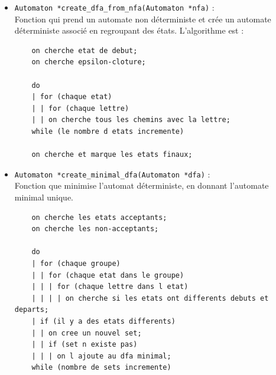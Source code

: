\documentclass[12pt]{article}
\begin{document}
\begin{itemize}
  \begin{lstlisting}
    entre : etat initial sous-automate
    entre : etat final sous-automate

    for (chaque feuille de l arbre)
    | if (feuille == ')')
    | | continue;
    | if (feuille == '.')
    | | on cree transition vide entre etat initial 2 et final 1;
    | | on ajoute transitions et etats au nfa;
    | | on ajoute transitions aux etats;
    | if (feuille == '|')
    | | on cree deux etats;
    | | on cree 4 transitions vides;
    | | on ajoute transitions et etats au nfa;
    | | on ajoute transitions aux etats;
    | if (feuille == '*')
    | | on cree deux etats;
    | | on cree 4 transitions vides;
    | | on ajoute transitions et etats au nfa;
    | | on ajoute transitions aux etats;
    | if (feuille == lettre)
    | | on cree deux etats;
    | | on cree une transition avec la lettre;
    | | on ajoute transitions et etats au nfa;
    | | on ajoute transitions aux etats;
  \end{lstlisting}

  
  \item \lstinline|Automaton *create_dfa_from_nfa(Automaton *nfa)| : \\
  Fonction qui prend un automate non déterministe et crée un automate déterministe associé en regroupant des états. L'algorithme est :

  \begin{lstlisting}
    on cherche etat de debut;
    on cherche epsilon-cloture;

    do
    | for (chaque etat)
    | | for (chaque lettre)
    | | on cherche tous les chemins avec la lettre;
    while (le nombre d etats incremente)

    on cherche et marque les etats finaux;
  \end{lstlisting}

  
  \item \lstinline|Automaton *create_minimal_dfa(Automaton *dfa)| : \\
  Fonction que minimise l'automat déterministe, en donnant l'automate minimal unique.

  \begin{lstlisting}
    on cherche les etats acceptants;
    on cherche les non-acceptants;

    do
    | for (chaque groupe)
    | | for (chaque etat dans le groupe)
    | | | for (chaque lettre dans l etat)
    | | | | on cherche si les etats ont differents debuts et departs;
    | if (il y a des etats differents)
    | | on cree un nouvel set;
    | | if (set n existe pas)
    | | | on l ajoute au dfa minimal;
    while (nombre de sets incremente)


\end{lstlisting}
\end{itemize}
\end{document}
